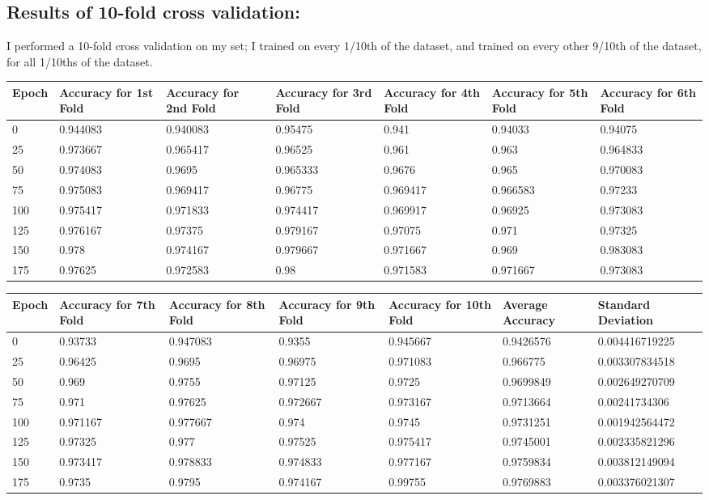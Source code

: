 \documentclass[a4paper]{article}
\begin{document}
\subsection{Results of 10-fold cross validation:}
\hspace*{10mm}
I performed a 10-fold cross validation on my set; I trained on every 1/10th of the dataset, and trained on every other 9/10th of the dataset, for all 1/10ths of the dataset.
\hspace*{-20mm}
\begin{center}
\begin{tabular}{||p{2cm}|p{2cm}|p{2cm}|p{2cm}|p{2cm}|p{2cm}|p{2cm}||}
 \hline
Epoch&
Accuracy for 1st Fold&
Accuracy for 2nd Fold&
Accuracy for 3rd Fold&
Accuracy for 4th Fold&
Accuracy for 5th Fold&
Accuracy for 6th Fold\\[0.5ex]\hline\hline
0&
0.944083&
0.940083&
0.95475&
0.941&
0.94033&
0.94075\\\hline
25&
0.973667&
0.965417&
0.96525&
0.961&
0.963&
0.964833\\\hline
50&
0.974083&
0.9695&
0.965333&
0.9676&
0.965&
0.970083\\\hline
75&
0.975083&
0.969417&
0.96775&
0.969417&
0.966583&
0.97233\\\hline
100&
0.975417&
0.971833&
0.974417&
0.969917&
0.96925&
0.973083\\\hline
125&
0.976167&
0.97375&
0.979167&
0.97075&
0.971&
0.97325
\\\hline
150&
0.978&
0.974167&
0.979667&
0.971667&
0.969&
0.983083\\\hline
175&
0.97625&
0.972583&
0.98&
0.971583&
0.971667&
0.973083\\\hline
\end{tabular}
\hspace*{-2mm}\begin{tabular}{||p{2cm}|p{2cm}|p{2cm}|p{2cm}|p{2cm}|p{2cm}|p{2.5cm}||}
 \hline
 Epoch&
 Accuracy for 7th Fold&
Accuracy for 8th Fold&
Accuracy for 9th Fold&
Accuracy for 10th Fold&
Average Accuracy&
Standard Deviation\\[0.5ex]\hline\hline
0&
0.93733&
0.947083&
0.9355&
0.945667&
0.9426576&
0.004416719225\\\hline
25&
0.96425&
0.9695&
0.96975&
0.971083&
0.966775&
0.003307834518\\\hline
50&
0.969&
0.9755&
0.97125&
0.9725&
0.9699849&
0.002649270709\\\hline
75&
0.971&
0.97625&
0.972667&
0.973167&
0.9713664&
0.00241734306\\\hline
100&
0.971167&
0.977667&
0.974&
0.9745&
0.9731251&
0.001942564472\\\hline
125&
0.97325&
0.977&
0.97525&
0.975417&
0.9745001&
0.002335821296\\\hline
150&
0.973417&
0.978833&
0.974833&
0.977167&
0.9759834&
0.003812149094\\\hline
175&
0.9735&
0.9795&
0.974167&
0.99755&
0.9769883&
0.003376021307\\\hline


\end{tabular}
\end{center}
\end{document}
